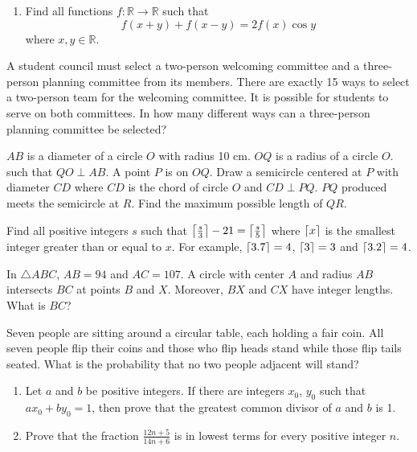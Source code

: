 \begin{problems}
\begin{enumerate}
        \item Find all functions $f:\mathbb{R} \rightarrow \mathbb{R}$ such
            that $$f(x + y) + f(x - y) = 2f(x)\cos y$$ where $x,y \in
            \mathbb{R}$.
    \end{enumerate}
    
    \problem A student council must select a two-person welcoming committee and
    a three-person planning committee from its members. There are exactly 15
    ways to select a two-person team for the welcoming committee. It is
    possible for students to serve on both committees. In how many different
    ways can a three-person planning committee be selected? 
    
    \problem $AB$ is a diameter of a circle $O$ with radius 10 cm. $OQ$ is a
    radius of a circle $O$. such that $QO \perp AB$. A point $P$ is on $OQ$.
    Draw a semicircle centered at $P$ with diameter $CD$ where $CD$ is the
    chord of circle $O$ and $CD \perp PQ$. $PQ$ produced meets the semicircle
    at $R$. Find the maximum possible length of $QR$. 
    
    \problem Find all positive integers $s$ such that $\ceil*{\frac{s}{3}} - 21
    = \ceil*{\frac{s}{5}}$ where $\ceil*{x}$ is the smallest integer greater
    than or equal to $x$. For example, $\ceil*{3.7} = 4$, $\ceil*{3} = 3$ and
    $\ceil*{3.2} = 4$. 
    
    \problem In $\triangle ABC$, $AB = 94$ and $AC = 107$. A circle with center
    $A$ and radius $AB$ intersects $BC$ at points $B$ and $X$. Moreover, $BX$
    and $CX$ have integer lengths. What is $BC$? 
    
    \problem Seven people are sitting around a circular table, each holding a
    fair coin. All seven people flip their coins and those who flip heads stand
    while those flip tails seated. What is the probability that no two people
    adjacent will stand? 
    
    \problem
    \begin{enumerate}
        \item Let $a$ and $b$ be positive integers. If there are integers
            $x_{0}$, $y_{0}$ such that $ax_{0} + by_{0} = 1$, then prove that
            the greatest common divisor of $a$ and $b$ is 1. 
        
        \item Prove that the fraction $\frac{12n + 5}{14n + 6}$ is in lowest
            terms for every positive integer $n$. 
    \end{enumerate}
    

\end{problems}
